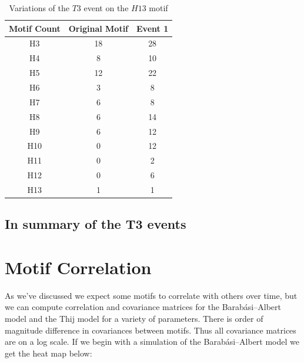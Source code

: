 \begin{table}
    \centering
    \begin{tabular}{||c c c||} 
    \hline
    Motif Count & Original Motif & Event 1\\ [0.5ex] 
    \hline\hline
    H3 & 18 & 28 \\ 
    \hline
    H4 & 8 & 10 \\
    \hline
    H5 & 12 & 22 \\
    \hline
    H6 & 3 & 8 \\
    \hline
    H7 & 6 & 8 \\
    \hline
    H8 & 6 & 14 \\
    \hline
    H9 & 6 & 12 \\
    \hline
    H10 & 0 & 12 \\
    \hline
    H11 & 0 & 2 \\
    \hline
    H12 & 0 & 6 \\
    \hline
    H13 & 1 & 1\\
    \hline
   \end{tabular}
   \caption{Variations of the $T3$ event on the $H13$ motif}
   \label{table:22}
\end{table}


\section{In summary of the T3 events}


\chapter{Motif Correlation}
As we've discussed we expect some motifs to correlate with others over time, but we 
can compute correlation and covariance matrices for the Barabási–Albert model and the Thij model
for a variety of parameters. There is order of magnitude difference in covariances between
motifs. Thus all covariance matrices are on a log scale.  If we begin with  a simulation of the Barabási–Albert model
we get the heat map below:



